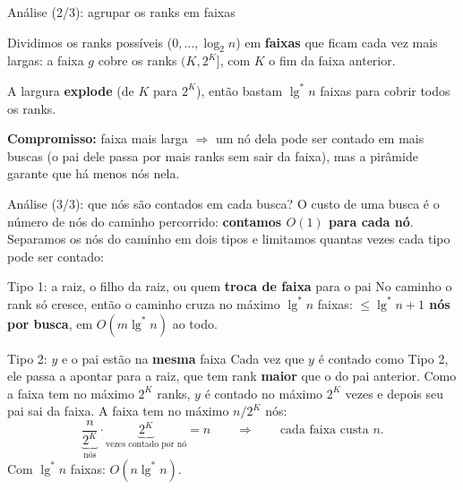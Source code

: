 \documentclass[aspectratio=169,10pt]{beamer}
\renewcommand{\lg}{\operatorname{lg}}
\newcommand{\lgs}{\lg^{*}}
\begin{document}
\begin{frame}[c]{Análise (2/3): agrupar os ranks em faixas}

  Dividimos os ranks possíveis ($0,\dots,\log_2n$) em \textbf{faixas}
  que ficam cada vez mais largas: a faixa $g$ cobre os ranks
  $(K,2^K]$, com $K$ o fim da faixa anterior.

  \medskip
  \centering

  \medskip
  \raggedright
  A largura \textbf{explode} (de $K$ para $2^K$), então bastam
  $\lgs n$ faixas para cobrir todos os ranks.

  \bigskip

  \textbf{Compromisso:} faixa mais larga $\Rightarrow$ um nó dela pode
  ser contado em mais buscas (o pai dele passa por mais ranks sem
  sair da faixa), mas a pirâmide garante que há menos nós
  nela. 
\end{frame}
\begin{frame}[t]{Análise (3/3): que nós são contados em cada busca?}
  \small
  O custo de uma busca é o número de nós do caminho percorrido: \textbf{contamos
    $O(1)$ para cada nó}.  Separamos os nós do caminho em dois tipos e
  limitamos quantas vezes cada tipo pode ser contado:
 
  \medskip
  \begin{block}{Tipo 1: a raiz, o filho da raiz, ou quem \textbf{troca de faixa} para o pai}
    No caminho o rank só cresce, então o caminho cruza no máximo
    $\lgs n$ faixas: \textbf{$\leq\lgs n+1$ nós por busca}, em
    $O(m\lgs n)$ ao todo.
  \end{block}
 
  \begin{block}{Tipo 2: $y$ e o pai estão na \textbf{mesma} faixa}
    Cada vez que $y$ é contado como Tipo 2, ele passa a apontar para a
    raiz, que tem rank \textbf{maior} que o do pai anterior.  Como a
    faixa tem no máximo $2^K$ ranks, $y$ é contado no máximo $2^K$ vezes
    e depois seu pai sai da faixa.  A faixa tem no máximo $n/2^K$ nós:
    \[
      \underbrace{\frac{n}{2^K}}_{\text{nós}}\cdot
      \underbrace{2^K}_{\text{vezes contado por nó}}=n
      \qquad\Rightarrow\qquad \text{cada faixa custa }n.
    \]
    Com $\lgs n$ faixas: $O(n\lgs n)$.
  \end{block}

\end{frame}
\end{document}
